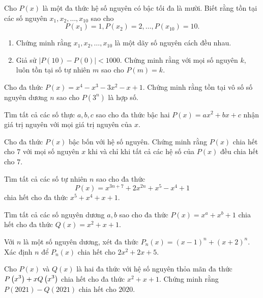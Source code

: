 \begin{btt}
Cho $P(x)$ là một đa thức hệ số nguyên có bậc tối đa là mười. Biết rằng tồn tại các số nguyên $x_1,x_2,\ldots,x_{10}$ sao cho
$$P\left(x_1\right)=1,P\left(x_2\right)=2,\ldots,P\left(x_{10}\right)=10.$$
\begin{enumerate}[a,]
    \item Chứng minh rằng $x_1,x_2,\ldots,x_{10}$ là một dãy số nguyên cách đều nhau.
    \item Giả sử $\left|P(10)-P(0)\right|<1000.$ Chứng minh rằng với mọi số nguyên $k,$ luôn tồn tại số tự nhiên $m$ sao cho $P(m)=k.$
\end{enumerate}
\end{btt}

\begin{btt}
Cho đa thức $P(x)=x^{4}-x^{3}-3 x^{2}-x+1.$ Chứng minh rằng tồn tại vô số số nguyên dương $n$ sao cho $P\left(3^{n}\right)$ là hợp số.
\end{btt}


\begin{btt}
Tìm tất cả các số thực $a,b,c$ sao cho đa thức bậc hai $P(x)=ax^2+bx+c$ nhận giá trị nguyên với mọi giá trị nguyên của $x.$
\end{btt}

\begin{btt}
Cho đa thức $P(x)$ bậc bốn với hệ số nguyên. Chứng minh rằng $P(x)$ chia hết cho $7$ với mọi số nguyên $x$ khi và chỉ khi tất cả các hệ số của $P(x)$ đều chia hết cho $7.$

\end{btt}

\begin{btt}
Tìm tất cả các số tự nhiên $n$ sao cho đa thức
$$P(x)=x^{3n+7}+2x^{2n}+x^5-x^4+1$$
chia hết cho đa thức $x^5+x^4+x+1.$
\end{btt}

\begin{btt}
Tìm tất cả các số nguyên dương $a,b$ sao cho đa thức $P(x)=x^a+x^b+1$ chia hết cho đa thức $Q(x)=x^2+x+1.$
\end{btt}

\begin{btt}
Với $n$ là một số nguyên dương, xét đa thức $P_n(x)=(x-1)^n+(x+2)^n.$ Xác định $n$ để $P_n(x)$ chia hết cho $2x^2+2x+5.$
\end{btt}

\begin{btt}
Cho $P(x)$ và $Q(x)$ là hai đa thức với hệ số nguyên thỏa mãn đa thức $P\left(\displaystyle x^3 \right)+xQ\left(\displaystyle x^3 \right)$ chia hết cho đa thức $x^2+x+1.$ Chứng minh rằng $P(2021)-Q(2021)$ chia hết cho $2020.$
\end{btt}

